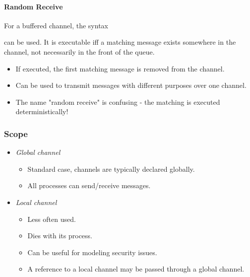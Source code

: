 				\paragraph{Random Receive}
					For a buffered channel, the syntax
					\begin{center}
					\end{center}
					can be used. It is executable iff a matching message exists somewhere in the channel, not necessarily in the front of the queue.
					\begin{itemize}
						\item If executed, the first matching message is removed from the channel.
						\item Can be used to transmit messages with different purposes over one channel.
						\item The name "random receive" is confusing - the matching is executed deterministically!
					\end{itemize}

			\subsubsection{Scope}
				\begin{itemize}
					\item \textit{Global channel}
						\begin{itemize}
							\item Standard case, channels are typically declared globally.
							\item All processes can send/receive messages.
						\end{itemize}
					\item \textit{Local channel}
						\begin{itemize}
							\item Less often used.
							\item Dies with its process.
							\item Can be useful for modeling security issues.
							\item A reference to a local channel may be passed through a global channel.
						\end{itemize}
				\end{itemize}

